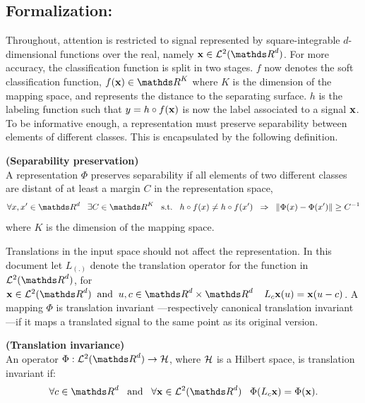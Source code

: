 \documentclass[a4paper,11pt]{report}
\begin{document}
      
		\subsection{Formalization:}
      \label{sec:Intro/Signal rep/Formalization}
      
			Throughout, attention is restricted to signal represented by square-integrable $d$-dimensional functions over the real, namely $\bfx \in \mcalL^{2}(\dsR^{d})$. For more accuracy, the classification function is split in two stages. $f$ now denotes the soft classification function, \ie $f(\bfx) \in \dsR^{K}$ where $K$ is the dimension of the mapping space, and represents the distance to the separating surface. $h$ is the labeling function such that $y=h \circ f({\bf x})$ is now the label associated to a signal ${\bf x}$. To be informative enough, a representation must preserve separability between elements of different classes. This is encapsulated by the following definition.
      
			\begin{defn} \textbf{(Separability preservation)}\\
				A representation $\Phi$ preserves separability if all elements of two different classes are distant of at least a margin $C$ in the representation space,
				\begin{equation*}
					\forall x,x' \in \dsR^{d} \;\;\; \exists C \in \dsR^{K} \;\;\; \st \;\;\; h \circ f(x) \neq h \circ f(x') \;\; \Rightarrow \;\; \norm{\Phi(x)-\Phi(x')} \geq C^{-1}
				\end{equation*}
				where $K$  is the dimension of the mapping space.
				\label{def:Separability}
			\end{defn}
			
      Translations in the input space should not affect the representation. In this document let $L_{(.)}$ denote the translation operator for the function in $\mcalL^{2}(\dsR^{d})$, \ie for $\bfx \in \mcalL^{2}(\dsR^{d}) \;\; \text{and} \;\; u,c \in \dsR^{d} \times \dsR^{d} \;\;\;\; L_{c}\bfx(u) = \bfx(u-c)$. A mapping $\Phi$ is translation invariant ---respectively canonical translation invariant ---if it maps a translated signal to the same point as its original version.

      \begin{defn} \textbf{(Translation invariance)}\\ 
				An operator $\Phi: \mcalL^{2}(\dsR^{d}) \rightarrow \mcalH$, where $\mathcal{H}$ is a Hilbert space, is translation invariant if:
	      	\begin{equation*}
			  		\forall c \in \dsR^{d} 
			  		\;\;\; \text{and}  \;\;\;
			  		\forall \bfx \in \mcalL^{2}(\dsR^{d}) \;\;\;
			  		\Phi(L_{c}\bfx) = \Phi(\bfx).
				\end{equation*}
				\label{def:Translation invariance - intuition}
      \end{defn}
      \vspace{-30pt}
\end{document}
